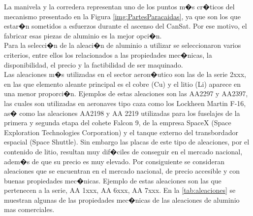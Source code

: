 \documentclass[10pt,a4paper]{book}
\begin{document}
La manivela y la corredera  representan uno de los puntos m�s cr�ticos del mecanismo presentado en la Figura \ref{img:PartesParacaidas}, ya que son los que estar�n sometidos a esfuerzos durante el ascenso del CanSat. Por ese motivo, el fabricar esas piezas de aluminio es la mejor opci�n.\\

Para la selecci�n de la aleaci�n de aluminio a utilizar se seleccionaron varios criterios, entre ellos los relacionados a las propiedades mec�nicas, la disponibilidad, el precio y la factibilidad de ser maquinado.\\ 
Las aleaciones m�s utilizadas en el sector aeron�utico son las de la serie 2xxx, en las que elemento aleante principal es el cobre (Cu) y el litio (Li) aparece en una menor proporci�n. Ejemplos de estas aleaciones son las AA2297 y AA2397, las cuales son utilizadas en aeronaves tipo caza como los Lockheen Martin F-16, as� como las aleaciones AA2198 y AA 2219 utilizadas para los fuselajes de la primera y segunda etapa del cohete Falcon 9, de la empresa SpaceX (Space Exploration Technologies Corporation) y el tanque externo del transbordador espacial (Space Shuttle). 
Sin embargo las placas de este tipo de aleaciones, por el contenido de litio, resultan muy dif�ciles de conseguir en el mercado nacional, adem�s de que su precio es muy elevado. Por consiguiente se consideran aleaciones que se encuentran en el mercado nacional, de precio accesible y con buenas propiedades mec�nicas. Ejemplo de estas aleaciones son las que  pertenecen a la serie, AA 1xxx, AA 6xxx, AA 7xxx. En la \ref{tab:aleaciones} se muestran algunas de las propiedades mec�nicas de las aleaciones de aluminio mas comerciales.
\begin{table}[H]
\begin{center}
\caption{Propiedades de las aleaciones de aluminio consideradas.\label{tab:aleaciones}}
\end{center}
\end{table}
\end{document}

